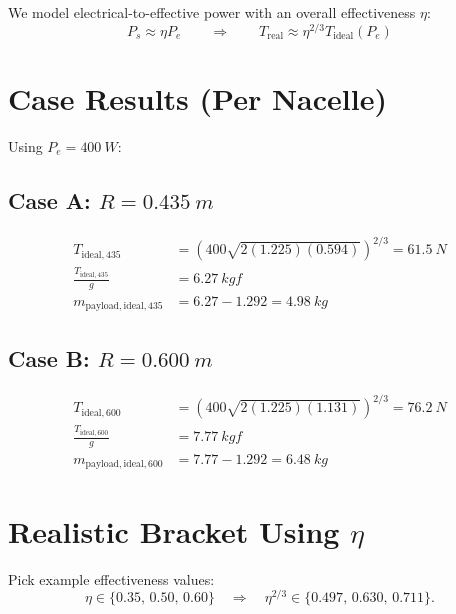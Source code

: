 \documentclass[11pt]{article}
\begin{document}
We model electrical-to-effective power with an overall effectiveness $\eta$:
\begin{equation}
P_s\approx \eta P_e
\qquad\Rightarrow\qquad
T_{\mathrm{real}}\approx \eta^{2/3} T_{\mathrm{ideal}}(P_e)
\end{equation}

\section{Case Results (Per Nacelle)}
Using $P_e=\SI{400}{W}$:

\subsection*{Case A: $R=\SI{0.435}{m}$}
\begin{align}
T_{\mathrm{ideal},435} &= \left(400\sqrt{2(1.225)(0.594)}\right)^{2/3} = \SI{61.5}{N} \\
\frac{T_{\mathrm{ideal},435}}{g} &= \SI{6.27}{kgf} \\
m_{\mathrm{payload,ideal},435} &= 6.27 - 1.292 = \SI{4.98}{kg}
\end{align}

\subsection*{Case B: $R=\SI{0.600}{m}$}
\begin{align}
T_{\mathrm{ideal},600} &= \left(400\sqrt{2(1.225)(1.131)}\right)^{2/3} = \SI{76.2}{N} \\
\frac{T_{\mathrm{ideal},600}}{g} &= \SI{7.77}{kgf} \\
m_{\mathrm{payload,ideal},600} &= 7.77 - 1.292 = \SI{6.48}{kg}
\end{align}

\section{Realistic Bracket Using \texorpdfstring{$\eta$}{eta}}
Pick example effectiveness values:
\[
\eta\in\{0.35,\,0.50,\,0.60\}
\quad\Rightarrow\quad
\eta^{2/3}\in\{0.497,\,0.630,\,0.711\}.
\]
\end{document}

